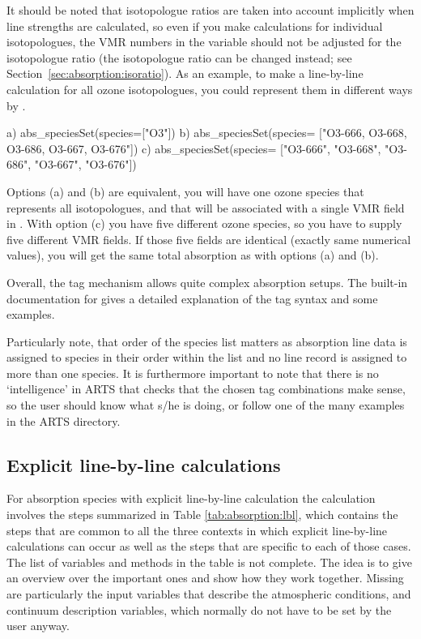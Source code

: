 It should be noted that isotopologue ratios are taken into account
implicitly when line strengths are calculated, so even if you make
calculations for individual isotopologues, the VMR numbers in the
variable  should not be adjusted for the isotopologue
ratio (the isotopologue ratio can be changed instead; see
Section~\ref{sec:absorption:isoratio}). As an example, to make a line-by-line
calculation for all ozone isotopologues, you could represent them in different
ways by
.
\begin{code}
a) abs_speciesSet(species=["O3"])
b) abs_speciesSet(species=
                  ["O3-666, O3-668, O3-686, O3-667, O3-676"])
c) abs_speciesSet(species= 
                  ["O3-666", "O3-668", "O3-686", "O3-667", "O3-676"])
\end{code}
Options (a) and (b) are equivalent, you will have one ozone species
that represents all isotopologues, and that will be associated with a
single VMR field in .  With option (c) you have
five different ozone species, so you have to supply five different VMR
fields. If those five fields are identical (exactly same numerical
values), you will get the same total absorption as with options (a)
and (b).

Overall, the tag mechanism allows quite complex absorption setups. The built-in
documentation for  gives a detailed explanation of the
tag syntax and some examples.

Particularly note, that order of the species list matters as absorption line
data is assigned to species in their order within the 
list and no line record is assigned to more than one species.
It is furthermore important to note that there is no `intelligence' in ARTS that
checks that the chosen tag combinations make sense, so the user should
know what s/he is doing, or follow one of the many examples in
the ARTS  directory.

\subsection{Explicit line-by-line calculations}

For absorption species with explicit line-by-line calculation the
calculation involves the steps summarized in Table
\ref{tab:absorption:lbl}, which contains the steps that are common to all the
three contexts in which explicit line-by-line calculations can occur as well
as the steps that are specific to each of those cases. 
The list of variables and methods in the
table is not complete. The idea is to give an overview over the
important ones and show how they work together. Missing are
particularly the input variables that describe the atmospheric
conditions, and continuum description variables, which normally do not
have to be set by the user anyway.

